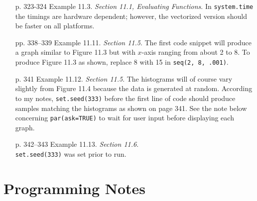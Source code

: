 \documentclass{article}
\begin{document}
\begin{enumerate}
\item[p. 323-324]Example 11.3.  \emph{Section 11.1, Evaluating Functions}.
In \texttt{system.time} the timings are hardware dependent; however, the vectorized version should be faster on all platforms.


 \item[pp. 338--339]Example 11.11.  \emph{Section 11.5}.
 The first code snippet will produce a graph similar to Figure 11.3 but with $x$-axis ranging from about 2 to 8. To produce Figure 11.3 as shown, replace 8 with 15 in \texttt{seq(2, 8, .001)}.

\item[p. 341]Example 11.12.  \emph{Section 11.5}.
The histograms will of course vary slightly from Figure 11.4 because the data is generated at random. According to my notes, \texttt{set.seed(333)} before the first line of code should produce samples matching the histograms as shown on page 341. See the note below concerning \texttt{par(ask=TRUE)} to wait for user input before displaying each graph.


\item[p. 342--343]Example 11.13.  \emph{Section 11.6}.\\
\texttt{set.seed(333)} was set prior to run.


\end{enumerate}


\section{Programming Notes}
\end{document}
